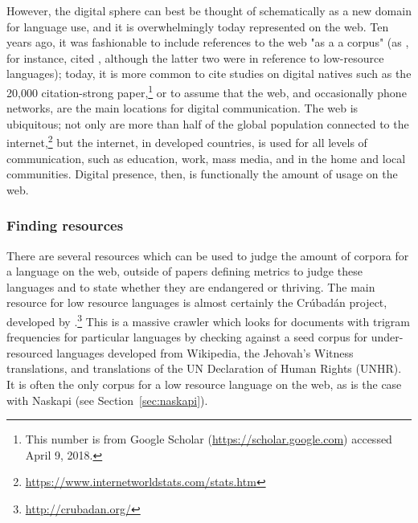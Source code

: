 However, the digital sphere can best be thought of schematically as a new domain for language use, and it is overwhelmingly today represented on the web. Ten years ago, it was fashionable to include references to the web "as a a corpus" (as \citet{scannell2007crubadan}, for instance, cited \citet{resnik1999mining, ghani2001mining, kilgarriff2001web}, although the latter two were in reference to low-resource languages); today, it is more common to cite studies on digital natives such as the 20,000 citation-strong \citet{prensky2001digital} paper,\footnote{This number is from Google Scholar (\href{https://scholar.google.com}{https://scholar.google.com}) accessed April 9, 2018.} or to assume that the web, and occasionally phone networks, are the main locations for digital communication. The web is ubiquitous; not only are more than half of the global population connected to the internet,\footnote{\href{https://www.internetworldstats.com/stats.htm}{https://www.internetworldstats.com/stats.htm}} but the internet, in developed countries, is used for all levels of communication, such as education, work, mass media, and in the home and local communities. Digital presence, then, is functionally the amount of usage on the web.

\subsubsection{Finding resources}
\label{subsec:finding-resources}

There are several resources which can be used to judge the amount of corpora for a language on the web, outside of papers defining metrics to judge these languages and to state whether they are endangered or thriving. The main resource for low resource languages is almost certainly the Cr\'ubad\'an project, developed by \citet{scannell2007crubadan}.\footnote{\href{http://crubadan.org/}{http://crubadan.org/}} This is a massive crawler which looks for documents with trigram frequencies for particular languages by checking against a seed corpus for under-resourced languages developed from Wikipedia, the Jehovah's Witness translations, and translations of the UN Declaration of Human Rights (UNHR). It is often the only corpus for a low resource language on the web, as is the case with Naskapi (see Section~\ref{sec:naskapi}).

